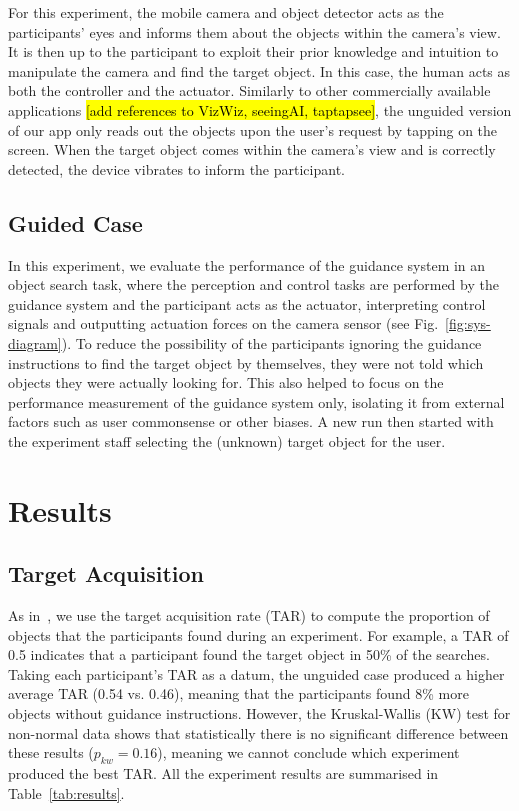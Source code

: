\documentclass[runningheads]{llncs}
\DeclareRobustCommand{\tofix}[1]{{\sethlcolor{yellow}\hl{[#1]}}}
\begin{document}
For this experiment, the mobile camera and object detector acts as the participants' eyes and informs them about the objects within the camera's view.
It is then up to the participant to exploit their prior knowledge and intuition to manipulate the camera and find the target object. 
In this case, the human acts as both the controller and the actuator. 
Similarly to other commercially available applications \tofix{add references to VizWiz, seeingAI, taptapsee}, the unguided version of our app only reads out the objects upon the user's request by tapping on the screen. 
When the target object comes within the camera's view and is correctly detected, the device vibrates to inform the participant. 


\subsection{Guided Case}

In this experiment, we evaluate the performance of the guidance system in an object search task, where the perception and control tasks are performed by the guidance system and the participant acts as the actuator, interpreting control signals and outputting actuation forces on the camera sensor (see Fig.~\ref{fig:sys-diagram}). 
%
To reduce the possibility of the participants ignoring the guidance instructions to find the target object by themselves, they were not told which objects they were actually looking for.
This also helped to focus on the performance measurement of the guidance system only, isolating it from external factors such as user commonsense or other biases.
A new run then started with the experiment staff selecting the (unknown) target object for the user.

\section{Results}\label{sec:results}

\subsection{Target Acquisition}

As in~\cite{lock2019active}, we use the target acquisition rate (TAR) to compute the proportion of objects that the participants found during an experiment. 
For example, a TAR of 0.5 indicates that a participant found the target object in 50\% of the searches. 
Taking each participant's TAR as a datum, the unguided case produced a higher average TAR (0.54 vs. 0.46), meaning that the participants found 8\% more objects without guidance instructions.
However, the Kruskal-Wallis (KW) test for non-normal data shows that statistically there is no significant difference between these results ($p_{kw} = 0.16$), meaning we cannot conclude which experiment produced the best TAR. 
All the experiment results are summarised in Table~\ref{tab:results}. 
\end{document}
